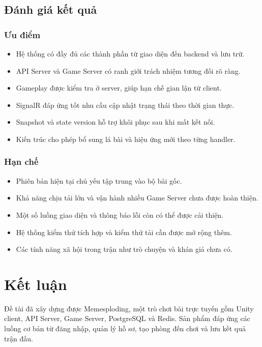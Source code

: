 \documentclass[a4paper]{report}
\begin{document}
\section{Đánh giá kết quả}

\subsection{Ưu điểm}

\begin{itemize}
    \item Hệ thống có đầy đủ các thành phần từ giao diện đến backend và lưu trữ.
    \item API Server và Game Server có ranh giới trách nhiệm tương đối rõ ràng.
    \item Gameplay được kiểm tra ở server, giúp hạn chế gian lận từ client.
    \item SignalR đáp ứng tốt nhu cầu cập nhật trạng thái theo thời gian thực.
    \item Snapshot và state version hỗ trợ khôi phục sau khi mất kết nối.
    \item Kiến trúc cho phép bổ sung lá bài và hiệu ứng mới theo từng handler.
\end{itemize}

\subsection{Hạn chế}

\begin{itemize}
    \item Phiên bản hiện tại chủ yếu tập trung vào bộ bài gốc.
    \item Khả năng chịu tải lớn và vận hành nhiều Game Server chưa được hoàn thiện.
    \item Một số luồng giao diện và thông báo lỗi còn có thể được cải thiện.
    \item Hệ thống kiểm thử tích hợp và kiểm thử tải cần được mở rộng thêm.
    \item Các tính năng xã hội trong trận như trò chuyện và khán giả chưa có.
\end{itemize}

\chapter{Kết luận}

Đề tài đã xây dựng được Memesploding, một trò chơi bài trực tuyến gồm Unity
client, API Server, Game Server, PostgreSQL và Redis. Sản phẩm đáp ứng các luồng
cơ bản từ đăng nhập, quản lý hồ sơ, tạo phòng đến chơi và lưu kết quả trận đấu.
\end{document}
